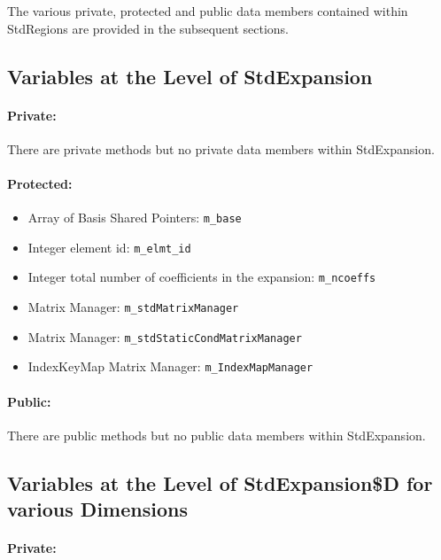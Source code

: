 The various private, protected and public data members contained within StdRegions are provided in the subsequent sections.

\subsection{Variables at the Level of StdExpansion}

\paragraph{Private:}

There are private methods but no private data members within StdExpansion.

\paragraph{Protected:}

\begin{itemize}
\item  Array of Basis Shared Pointers:  \verb+m_base+
% 
\item  Integer element id: \verb+m_elmt_id+
%
\item Integer total number of coefficients in the expansion:  \verb+m_ncoeffs+
%
\item Matrix Manager: \verb+m_stdMatrixManager+
%
\item Matrix Manager: \verb+m_stdStaticCondMatrixManager+
%
\item IndexKeyMap Matrix Manager: \verb+m_IndexMapManager+
\end{itemize}


\paragraph{Public:}

There are public methods but no public data members within StdExpansion.



\subsection{Variables at the Level of StdExpansion\$D for various Dimensions}

\paragraph{Private:}


